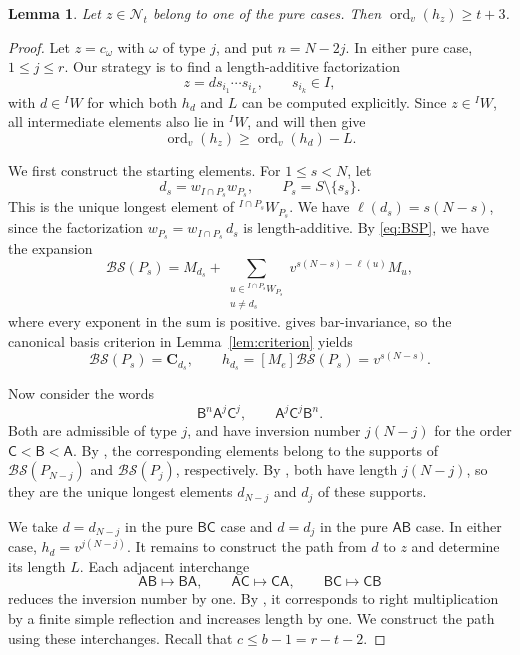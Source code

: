 \documentclass[11pt,a4paper,reqno]{amsart}
\numberwithin{equation}{section}
\newtheorem{lemma}[theorem]{Lemma}
\theoremstyle{definition}
\theoremstyle{remark}
\theoremstyle{plain}
\newcommand{\C}{\mathbf C}
\newcommand{\ord}{\operatorname{ord}_v}
\newcommand{\A}{\mathsf A}
\newcommand{\B}{\mathsf B}
\newcommand{\CC}{\mathsf C}
\newcommand{\D}{\mathcal {BS}}
\begin{document}
\begin{lemma}\label{lem:pure}
Let $z\in\mathcal N_t$ belong to one of the pure cases.
Then $\ord(h_z)\geq t+3$.
\end{lemma}
\begin{proof}
Let $z=c_\omega$ with $\omega$ of type $j$, and put $n=N-2j$.
In either pure case, $1\leq j\leq r$.
Our strategy is to find a length-additive factorization
\[
z=ds_{i_1}\cdots s_{i_L}, \qquad s_{i_k}\in I,
\]
with $d\in{}^IW$ for which both $h_{d}$ and $L$ can be computed explicitly.
Since $z\in{}^IW$, all intermediate elements also lie in ${}^IW$, and  will then give
\begin{equation}\label{eq:purecase-step}
 \ord(h_z)\geq\ord(h_{d})-L. 
\end{equation}

We first construct the starting elements.
For $1\leq s<N$, let
\[
 d_s=w_{I\cap P_s}w_{P_s}, \qquad P_s=S\setminus\{s_s\}.
\]
This is the unique longest element of $ {}^{I\cap P_s}W_{P_s}$.
We have $\ell(d_s)=s(N-s)$, since the factorization $w_{P_s}=w_{I\cap P_s}\,d_s$ is length-additive.
By \cref{eq:BSP}, we have the expansion
\[
\D(P_s)=M_{d_s}+ \sum_{\substack{u\in{}^{I\cap P_s}W_{P_s}\\u\ne d_s}} v^{s(N-s)-\ell(u)}M_u,
\]
where every exponent in the sum is positive.
 gives bar-invariance, so the canonical basis criterion in Lemma~\ref{lem:criterion} yields
\[
 \D(P_s)=\C_{d_s},\qquad h_{d_s}=[M_e]\D(P_s)=v^{s(N-s)}.
\]

Now consider the words
\[
\B^n\A^j\CC^j,\qquad \A^j\CC^j\B^n.
\]
Both are admissible of type $j$, and have inversion number $j(N-j)$ for the order $\CC<\B<\A$.
By , the corresponding elements belong to the supports of $\D(P_{N-j})$ and $\D(P_j)$, respectively.
By , both have length $j(N-j)$, so they are the unique longest elements $d_{N-j}$ and $d_j$ of these supports.

We take $d=d_{N-j}$ in the pure $\B\CC$ case and $d=d_j$ in the pure $\A\B$ case.
In either case, $h_{d}=v^{j(N-j)}$.
It remains to construct the path from $d$ to $z$ and determine its length $L$.
Each adjacent interchange
\[
 \A\B\longmapsto\B\A,\qquad
 \A\CC\longmapsto\CC\A,\qquad
 \B\CC\longmapsto\CC\B
\]
reduces the inversion number by one.
By , it corresponds to right multiplication by a finite simple reflection and increases length by one.
We construct the path using these interchanges.
Recall that $c\leq b-1=r-t-2$.


\end{proof}
\end{document}
